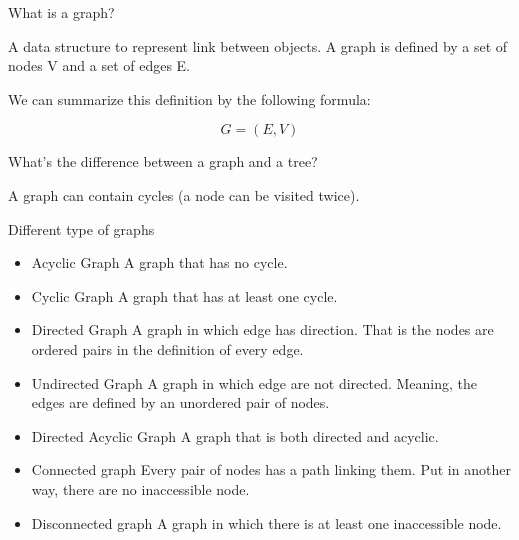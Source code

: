 \documentclass[ignorenonframetext,]{beamer}
\providecommand{\tightlist}{%
  \setlength{\itemsep}{0pt}\setlength{\parskip}{0pt}}
\begin{document}
\begin{frame}{What is a graph?}
\protect\hypertarget{what-is-a-graph}{}

A data structure to represent link between objects. A graph is defined
by a set of nodes V and a set of edges E.

We can summarize this definition by the following formula:

\[
G = (E, V)
\]

\begin{block}{What's the difference between a graph and a tree?}

A graph can contain cycles (a node can be visited twice).

\end{block}

\begin{block}{Different type of graphs}

\begin{itemize}
\tightlist
\item
  Acyclic Graph A graph that has no cycle.
\item
  Cyclic Graph A graph that has at least one cycle.
\item
  Directed Graph A graph in which edge has direction. That is the nodes
  are ordered pairs in the definition of every edge.
\item
  Undirected Graph A graph in which edge are not directed. Meaning, the
  edges are defined by an unordered pair of nodes.
\item
  Directed Acyclic Graph A graph that is both directed and acyclic.
\item
  Connected graph Every pair of nodes has a path linking them. Put in
  another way, there are no inaccessible node.
\item
  Disconnected graph A graph in which there is at least one inaccessible
  node.
\end{itemize}

\end{block}

\end{frame}
\end{document}
